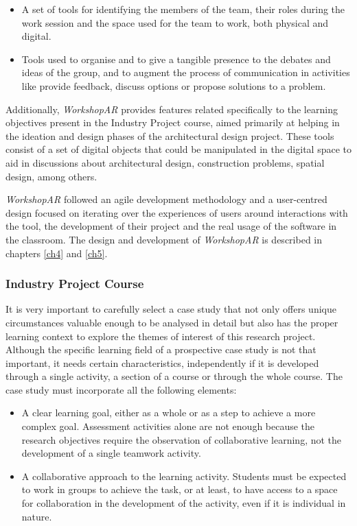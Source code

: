 \begin{itemize}
    \item A set of tools for identifying the members of the team, their roles during the work session and the space used for the team to work, both physical and digital. 
    \item Tools used to organise and to give a tangible presence to the debates and ideas of the group, and to augment the process of communication in activities like provide
    feedback, discuss options or propose solutions to a problem. 
\end{itemize}

Additionally, \emph{WorkshopAR} provides features related specifically to the learning objectives present in the Industry Project course, aimed primarily at helping in the ideation
and design phases of the architectural design project. These tools consist of a set of digital objects that could be manipulated in the digital space to aid in discussions about
architectural design, construction problems, spatial design, among others.

\emph{WorkshopAR} followed an agile development methodology and a user-centred design focused on iterating over the experiences of users around interactions with the tool, the
development of their project and the real usage of the software in the classroom. The design and development of \emph{WorkshopAR} is described in chapters \ref{ch4} and \ref{ch5}.

\subsubsection{Industry Project Course \label{sec:1-2-2-2}}
It is very important to carefully select a case study that not only offers unique circumstances valuable enough to be analysed in detail but also has the proper
learning context to explore the themes of interest of this research project. Although the specific learning field of a prospective case study is not that important,
it needs certain characteristics, independently if it is developed through a single activity, a section of a course or through the whole course. The case study must
incorporate all the following elements:

\begin{itemize}
    \item A clear learning goal, either as a whole or as a step to achieve a more complex goal. Assessment activities alone are not enough because the research objectives
    require the observation of collaborative learning, not the development of a single teamwork activity.  
    \item A collaborative approach to the learning activity. Students must be expected to work in groups to achieve the task, or at least, to have access to a space for
    collaboration in the development of the activity, even if it is individual in nature. 
\end{itemize}


